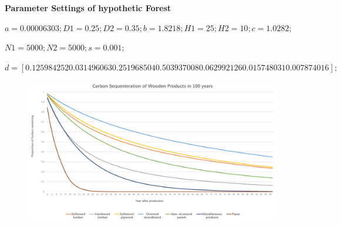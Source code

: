 \documentclass{mcmthesis}
\numberwithin{figure}{section}
\numberwithin{table}{section}
\numberwithin{equation}{section}
\begin{document}




\lhead{\small\sffamily \team}

\begin{appendices}

\textbf{Parameter Settings of hypothetic Forest}

$ a=0.00006303;
D1=0.25;
D2=0.35;
b=1.8218;
H1=25;
H2=10;
c=1.0282;$

$
N1=5000;
N2=5000;
s=0.001;%
$

$
d=[0.125984252 0.031496063 0.251968504 0.503937008 0.062992126 0.015748031 
0.007874016];
 $ 

\begin{figure}[htbp]
  \centering
  \includegraphics[width = 14cm]{code&pic/产品腐败数据.pdf}
\end{figure}


\end{appendices}
\end{document}

